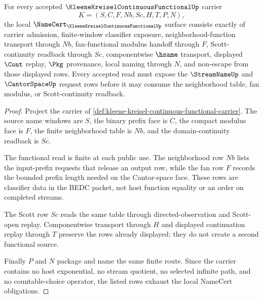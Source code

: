 \begin{theorem}
\label{thm:kleene-kreisel-continuous-functional-namecert-obligations}
For every accepted $\KleeneKreiselContinuousFunctionalUp$ carrier
$$
K=(S,C,F,Nb,Sc,H,T,P,N),
$$
the local $\NameCert_{\KleeneKreiselContinuousFunctionalUp}$ surface consists exactly of carrier admission, finite-window classifier exposure, neighborhood-function transport through $Nb$, fan-functional modulus handoff through $F$, Scott-continuity readback through $Sc$, componentwise $\hsame$ transport, displayed $\Cont$ replay, $\Pkg$ provenance, local naming through $N$, and non-escape from those displayed rows. Every accepted read must expose the $\StreamNameUp$ and $\CantorSpaceUp$ request rows before it may consume the neighborhood table, fan modulus, or Scott-continuity readback.
\end{theorem}
\begin{proof}
Project the carrier of \autoref{def:kleene-kreisel-continuous-functional-carrier}. The source name windows are $S$, the binary prefix face is $C$, the compact modulus face is $F$, the finite neighborhood table is $Nb$, and the domain-continuity readback is $Sc$.

The functional read is finite at each public use. The neighborhood row $Nb$ lists the input-prefix requests that release an output row, while the fan row $F$ records the bounded prefix length needed on the Cantor-space face. These rows are classifier data in the BEDC packet, not host function equality or an order on completed streams.

The Scott row $Sc$ reads the same table through directed-observation and Scott-open replay. Componentwise transport through $H$ and displayed continuation replay through $T$ preserve the rows already displayed; they do not create a second functional source.

Finally $P$ and $N$ package and name the same finite route. Since the carrier contains no host exponential, no stream quotient, no selected infinite path, and no countable-choice operator, the listed rows exhaust the local NameCert obligations.
\end{proof}

